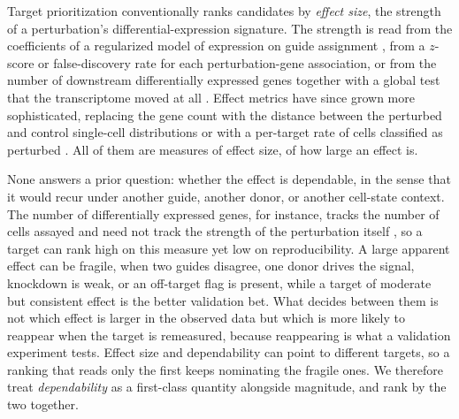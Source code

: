 \documentclass[11pt]{article}
\begin{document}
Target prioritization conventionally ranks candidates by \emph{effect size}, the
strength of a perturbation's differential-expression signature. The strength is read from the
coefficients of a regularized model of expression on guide assignment
\parencite{dixit2016}, from a $z$-score or false-discovery rate for each
perturbation-gene association, or from the number of downstream differentially
expressed genes together with a global test that the transcriptome moved at all
\parencite{replogle2022}. Effect metrics have since grown more sophisticated,
replacing the gene count with the distance between the perturbed and control
single-cell distributions \parencite{peidli2024} or with a per-target rate of
cells classified as perturbed \parencite{papalexi2021}. All of them are measures of
effect size, of how large an effect is.

None answers a prior question: whether the effect is dependable, in the sense that
it would recur under another guide, another donor, or another cell-state context.
The number of differentially expressed genes, for instance, tracks the number of
cells assayed \parencite{dixit2016} and need not track the strength of the
perturbation itself \parencite{norman2019}, so a target can rank high on this
measure yet low on reproducibility. A large apparent effect can be fragile, when
two guides disagree, one donor drives the signal, knockdown is weak, or an
off-target flag is present, while a target of moderate but consistent effect is
the better validation bet. What decides between them is not which effect is larger
in the observed data but which is more likely to reappear when the target is
remeasured, because reappearing is what a validation experiment tests. Effect size
and dependability can point to different targets, so a ranking that reads only the
first keeps nominating the fragile ones. We therefore treat \emph{dependability} as
a first-class quantity alongside magnitude, and rank by the two together.
\end{document}
